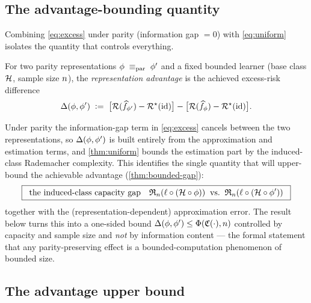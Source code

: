 \subsection{The advantage-bounding quantity}
\label{subsec:advantage-quantity}

Combining \eqref{eq:excess} under parity (information gap $=0$) with
\eqref{eq:uniform} isolates the quantity that controls everything.

\begin{definition}
\label{def:advantage}
For two parity representations $\phi\;\equiv_{\mathrm{par}}\;\phi'$ and a fixed bounded learner
(base class $\mathcal{H}$, sample size $n$), the \emph{representation
advantage} is the achieved excess-risk difference
\[
  \Delta(\phi,\phi')
  \;\vcentcolon=\;
  \big[\mathcal{R}(\widehat{f}_{\phi'}) - \mathcal{R}^{\star}(\mathrm{id})\big]
  - \big[\mathcal{R}(\widehat{f}_{\phi}) - \mathcal{R}^{\star}(\mathrm{id})\big].
\]
\end{definition}

Under parity the information-gap term in \eqref{eq:excess} cancels between the
two representations, so $\Delta(\phi,\phi')$ is built entirely from the
approximation and estimation terms, and \cref{thm:uniform} bounds the
estimation part by the induced-class Rademacher complexity. This identifies
the single quantity that will upper-bound the achievable advantage (\cref{thm:bounded-gap}):
\begin{equation}
  \label{eq:advantage-quantity}
  \boxed{\;\;
  \text{the induced-class capacity gap}\quad
  \mathfrak{R}_n(\ell\circ(\mathcal{H}\circ\phi))
  \;\;\text{vs.}\;\;
  \mathfrak{R}_n(\ell\circ(\mathcal{H}\circ\phi'))
  \;\;}
\end{equation}
together with the (representation-dependent) approximation error. The result
below turns this into a one-sided bound $\Delta(\phi,\phi') \le
\Phi(\mathfrak{C}(\cdot),n)$ controlled by capacity and sample size and
\emph{not} by information content --- the formal statement that any
parity-preserving effect is a bounded-computation phenomenon of bounded size.

\subsection{The advantage upper bound}
\label{subsec:advantage-bound}

